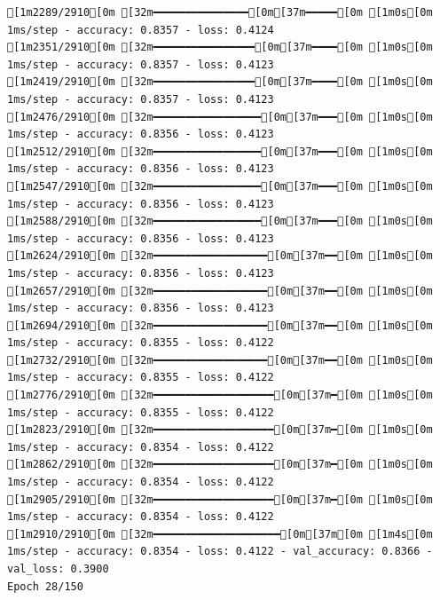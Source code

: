 \documentclass[
  letterpaper,
  DIV=11,
  numbers=noendperiod]{scrartcl}
\begin{document}
\begin{verbatim}
[1m2289/2910[0m [32m━━━━━━━━━━━━━━━[0m[37m━━━━━[0m [1m0s[0m 1ms/step - accuracy: 0.8357 - loss: 0.4124
[1m2351/2910[0m [32m━━━━━━━━━━━━━━━━[0m[37m━━━━[0m [1m0s[0m 1ms/step - accuracy: 0.8357 - loss: 0.4123
[1m2419/2910[0m [32m━━━━━━━━━━━━━━━━[0m[37m━━━━[0m [1m0s[0m 1ms/step - accuracy: 0.8357 - loss: 0.4123
[1m2476/2910[0m [32m━━━━━━━━━━━━━━━━━[0m[37m━━━[0m [1m0s[0m 1ms/step - accuracy: 0.8356 - loss: 0.4123
[1m2512/2910[0m [32m━━━━━━━━━━━━━━━━━[0m[37m━━━[0m [1m0s[0m 1ms/step - accuracy: 0.8356 - loss: 0.4123
[1m2547/2910[0m [32m━━━━━━━━━━━━━━━━━[0m[37m━━━[0m [1m0s[0m 1ms/step - accuracy: 0.8356 - loss: 0.4123
[1m2588/2910[0m [32m━━━━━━━━━━━━━━━━━[0m[37m━━━[0m [1m0s[0m 1ms/step - accuracy: 0.8356 - loss: 0.4123
[1m2624/2910[0m [32m━━━━━━━━━━━━━━━━━━[0m[37m━━[0m [1m0s[0m 1ms/step - accuracy: 0.8356 - loss: 0.4123
[1m2657/2910[0m [32m━━━━━━━━━━━━━━━━━━[0m[37m━━[0m [1m0s[0m 1ms/step - accuracy: 0.8356 - loss: 0.4123
[1m2694/2910[0m [32m━━━━━━━━━━━━━━━━━━[0m[37m━━[0m [1m0s[0m 1ms/step - accuracy: 0.8355 - loss: 0.4122
[1m2732/2910[0m [32m━━━━━━━━━━━━━━━━━━[0m[37m━━[0m [1m0s[0m 1ms/step - accuracy: 0.8355 - loss: 0.4122
[1m2776/2910[0m [32m━━━━━━━━━━━━━━━━━━━[0m[37m━[0m [1m0s[0m 1ms/step - accuracy: 0.8355 - loss: 0.4122
[1m2823/2910[0m [32m━━━━━━━━━━━━━━━━━━━[0m[37m━[0m [1m0s[0m 1ms/step - accuracy: 0.8354 - loss: 0.4122
[1m2862/2910[0m [32m━━━━━━━━━━━━━━━━━━━[0m[37m━[0m [1m0s[0m 1ms/step - accuracy: 0.8354 - loss: 0.4122
[1m2905/2910[0m [32m━━━━━━━━━━━━━━━━━━━[0m[37m━[0m [1m0s[0m 1ms/step - accuracy: 0.8354 - loss: 0.4122
[1m2910/2910[0m [32m━━━━━━━━━━━━━━━━━━━━[0m[37m[0m [1m4s[0m 1ms/step - accuracy: 0.8354 - loss: 0.4122 - val_accuracy: 0.8366 - val_loss: 0.3900
Epoch 28/150


\end{verbatim}
\end{document}

